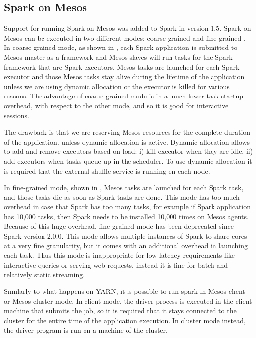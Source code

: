 \subsection{Spark on Mesos}\label{subsec:sparkOnMesos}
Support for running Spark on Mesos was added to Spark in version 1.5. Spark on Mesos can be executed in two different modes: coarse-grained and fine-grained \cite{misc:SparkOnMesos}.
In coarse-grained mode, as shown in , each Spark application is submitted to Mesos master as a framework and Mesos slaves will run tasks for the Spark framework that are Spark executors. Mesos tasks are launched for each Spark executor and those Mesos tasks stay alive during the lifetime of the application unless we are using dynamic allocation or the executor is killed for various reasons. The advantage of coarse-grained mode is in a much lower task startup overhead, with respect to the other mode, and so it is good
for interactive sessions.

The drawback is that we are reserving Mesos resources for the complete duration of the application, unless dynamic allocation is active. Dynamic allocation allows to add and remove executors based on load: i) kill executor when they are idle, ii) add executors when tasks
queue up in the scheduler. To use dynamic allocation it is required that the external shuffle service is running on each node.

In fine-grained mode, shown in , Mesos tasks are launched for each Spark task, and those tasks die as soon as Spark tasks are done. This mode has too much overhead in case that Spark has too many tasks, for example if Spark application has 10,000 tasks, then Spark needs to be installed 10,000 times on Mesos agents. Because
of this huge overhead, fine-grained mode has been deprecated since Spark version 2.0.0.         This mode allows multiple instances of Spark to share cores at a very fine granularity, but it comes with an additional  overhead in launching each task. Thus this mode is inappropriate
for low-latency requirements like interactive queries or serving web requests, instead it is fine for batch and relatively static streaming. 

Similarly to what happens on YARN, it is possible to run spark in Mesos-client or Mesos-cluster mode. In client mode, the driver process
is executed in the client machine that submits the job, so it is required that it stays connected to the cluster for the entire time of the application execution. In cluster mode instead, the driver program is run on a machine of the cluster.

